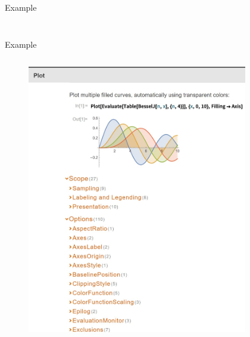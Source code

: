 \documentclass{beamer}
\begin{document}
\begin{frame}{Example}
\begin{columns}
\begin{column}{0.5\linewidth}
\begin{figure}[htbp]
            \end{figure}
        \end{column}
    \end{columns}
\end{frame}

\begin{frame}{Example}
    \begin{columns}
        \begin{column}{0.5\linewidth}
            \begin{figure}[htbp]
                \centering
                \includegraphics[width=\textwidth]{img/mma_plot.jpg}
            \end{figure}
        \end{column}
        \begin{column}{0.5\linewidth}
            \begin{figure}[htbp]
                \centering

\end{figure}
\end{column}
\end{columns}
\end{frame}
\end{document}
